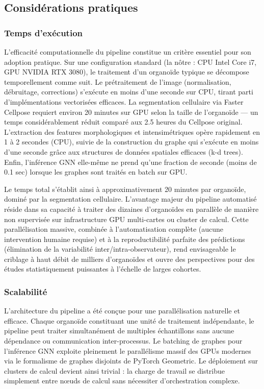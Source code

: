 \subsection{Considérations pratiques}

\subsubsection{Temps d'exécution}

L'efficacité computationnelle du pipeline constitue un critère essentiel pour son adoption pratique. Sur une configuration standard (la nôtre : CPU Intel Core i7, GPU NVIDIA RTX 3080), le traitement d'un organoïde typique se décompose temporellement comme suit. Le prétraitement de l'image (normalisation, débruitage, corrections) s'exécute en moins d'une seconde sur CPU, tirant parti d'implémentations vectorisées efficaces. La segmentation cellulaire via Faster Cellpose requiert environ 20 minutes sur GPU selon la taille de l'organoïde — un temps considérablement réduit comparé aux 2.5 heures du Cellpose original. L'extraction des features morphologiques et intensimétriques opère rapidement en 1 à 2 secondes (CPU), suivie de la construction du graphe qui s'exécute en moins d'une seconde grâce aux structures de données spatiales efficaces (k-d trees). Enfin, l'inférence GNN elle-même ne prend qu'une fraction de seconde (moins de 0.1 sec) lorsque les graphes sont traités en batch sur GPU.

Le temps total s'établit ainsi à approximativement 20 minutes par organoïde, dominé par la segmentation cellulaire. L'avantage majeur du pipeline automatisé réside dans sa capacité à traiter des dizaines d'organoïdes en parallèle de manière non supervisée sur infrastructure GPU multi-cartes ou cluster de calcul. Cette parallélisation massive, combinée à l'automatisation complète (aucune intervention humaine requise) et à la reproductibilité parfaite des prédictions (élimination de la variabilité inter/intra-observateur), rend envisageable le criblage à haut débit de milliers d'organoïdes et ouvre des perspectives pour des études statistiquement puissantes à l'échelle de larges cohortes.

\subsubsection{Scalabilité}

L'architecture du pipeline a été conçue pour une parallélisation naturelle et efficace. Chaque organoïde constituant une unité de traitement indépendante, le pipeline peut traiter simultanément de multiples échantillons sans aucune dépendance ou communication inter-processus. Le batching de graphes pour l'inférence GNN exploite pleinement le parallélisme massif des GPUs modernes via le formalisme de graphes disjoints de PyTorch Geometric. Le déploiement sur clusters de calcul devient ainsi trivial : la charge de travail se distribue simplement entre nœuds de calcul sans nécessiter d'orchestration complexe.

